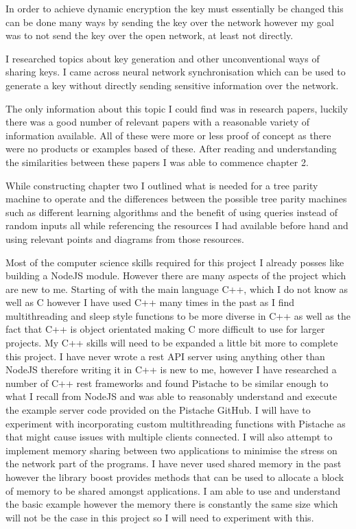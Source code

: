 In order to achieve dynamic encryption the key must essentially be changed this can be done many ways by sending the key over the network however my goal was to not send the key over the open network, at least not directly. 

I researched topics about key generation and other unconventional ways of sharing keys. 
I came across neural network synchronisation which can be used to generate a key without directly sending sensitive information over the network. 

The only information about this topic I could find was in research papers, luckily there was a good number of relevant papers with a reasonable variety of information available. All of these were more or less proof of concept as there were no products or examples based of these. After reading and understanding the similarities between these papers I was able to commence chapter 2. 

While constructing chapter two I outlined what is needed for a tree parity machine to operate and the differences between the possible tree parity machines such as different learning algorithms and the benefit of using queries instead of random inputs all while referencing the resources I had available before hand and using relevant points and diagrams from those resources.




Most of the computer science skills required for this project I already posses like building a NodeJS module. However there are many aspects of the project which are new to me. Starting of with the main language C++, which I do not know as well as C however I have used C++ many times in the past as I find multithreading and sleep style functions to be more diverse in C++ as well as the fact that C++ is object orientated making C more difficult to use for larger projects. My C++ skills will need to be expanded a little bit more to complete this project. I have never wrote a rest API server using anything other than NodeJS therefore writing it in C++ is new to me, however I have researched a number of C++ rest frameworks and found Pistache to be similar enough to what I recall from NodeJS and was able to reasonably understand and execute the example server code provided on the Pistache GitHub. I will have to experiment with incorporating custom multithreading functions with Pistache as that might cause issues with multiple clients connected.
I will also attempt to implement memory sharing between two applications to minimise the stress on the network part of the programs. I have never used shared memory in the past however the library boost provides methods that can be used to allocate a block of memory to be shared amongst applications. I am able to use and understand the basic example however the memory there is constantly the same size which will not be the case in this project so I will need to experiment with this.






